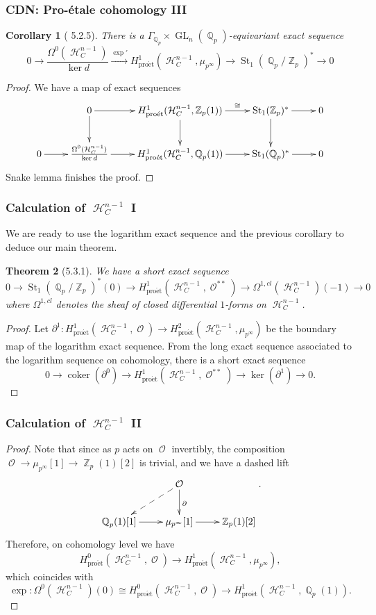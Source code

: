 \documentclass{beamer}
\newtheorem{thm}{Theorem}
\newtheorem{cor}[thm]{Corollary}
\theoremstyle{definition}
\newcommand{\coker}{\operatorname{coker}}
\newcommand{\pet}{\operatorname{pro\acute{e}t}}
\newcommand{\St}{\operatorname{St}}
\newcommand{\GL}{\operatorname{GL}}
\newcommand{\OO}{\operatorname{\mathcal{O}}}
\newcommand{\ZZ}{\operatorname{\mathbb{Z}}}
\newcommand{\QQ}{\operatorname{\mathbb{Q}}}
\newcommand{\HH}{\operatorname{\mathcal{H}}}
\begin{document}
\begin{frame}
\frametitle{CDN: Pro-\'etale cohomology III}

\begin{cor}[\cite{24} 5.2.5]\label{CDNr}
	There is a $\Gamma_{\QQ_p} \times \GL_n(\QQ_p)$-equivariant exact sequence
	$$0 \to \frac{\Omega^{0}(\HH_C^{n - 1})}{\ker d} \xrightarrow{\exp '} H^1_{\pet}(\HH_C^{n - 1}, \mu_{p^\infty}) \to \St_1(\QQ_p/\ZZ_p)^* \to 0$$
\end{cor}


\begin{proof}
	We have a map of exact sequences \[ \xymatrix{& 0 \ar[r] \ar[d] & H^1_{\pet}(\HH_C^{n - 1}, \ZZ_p(1)) \ar[r]^-{\cong} \ar[d] & \St_1(\ZZ_p)^* \ar[r] \ar[d] & 0 \\ 0 \ar[r] & \frac{\Omega^{0}(\HH_C^{n - 1})}{\ker d} \ar[r] & H^1_{\pet}(\HH_C^{n - 1}, \QQ_p(1)) \ar[r] & \St_1(\QQ_p)^* \ar[r] & 0}  \] Snake lemma finishes the proof.\end{proof}
\end{frame}

\begin{frame}
\frametitle{Calculation of $\HH_C^{n - 1}$ I}
We are ready to use the logarithm exact sequence and the previous corollary to deduce our main theorem.
\begin{thm}[5.3.1]\label{531}
	We have a short exact sequence $$0 \to \St_1(\QQ_p/\ZZ_p)^*(0) \to H^1_{\pet}(\HH_C^{n - 1}, \OO^{**}) \to \Omega^{1, cl}(\HH_C^{n - 1})(-1) \to 0$$ where $\Omega^{1, cl}$ denotes the sheaf of closed differential $1$-forms on $\HH_C^{n - 1}$.
\end{thm}

\begin{proof}
Let $\partial^1: H^1_{\pet}(\HH_C^{n - 1}, \OO) \to H^2_{\pet}(\HH_C^{n - 1}, \mu_{p^\infty})$ be the boundary map of the logarithm exact sequence. From the long exact sequence associated to the logarithm sequence on cohomology, there is a short exact sequence $$0 \to \coker(\partial^0) \to H^1_{\pet}(\HH_C^{n - 1}, \OO^{**}) \to \ker(\partial ^1) \to 0.$$
\end{proof}
\end{frame}

\begin{frame}
\frametitle{Calculation of $\HH_C^{n - 1}$ II}
\begin{proof}
Note that since as $p$ acts on $\OO$ invertibly, the composition $\OO \to \mu_{p^\infty}[1] \to \ZZ_p(1)[2]$ is trivial, and we have a dashed lift \[ \xymatrix{& \OO \ar@{-->}[dl] \ar[d]^{\partial} \\ \QQ_p(1)[1] \ar[r] & \mu_{p^\infty}[1] \ar[r] & \ZZ_p(1)[2]}. \] Therefore, on cohomology level we have $$H^0_{\pet}(\HH_C^{n - 1}, \OO) \to H^1_{\pet}(\HH_C^{n - 1}, \mu_{p^\infty}),$$ which coincides with $$\exp: \Omega^0(\HH_C^{n - 1})(0) \cong H^0_{\pet}(\HH_C^{n - 1}, \OO) \to H^1_{\pet}(\HH_C^{n - 1}, \QQ_p(1)).$$ \end{proof}
\end{frame}
\end{document}

